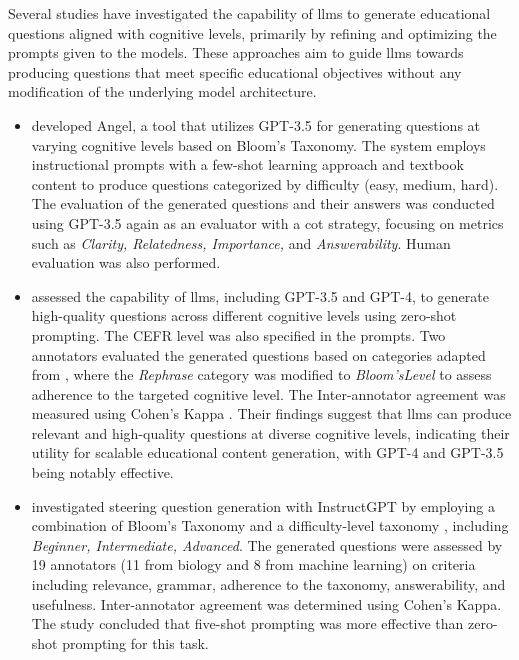  Several studies have investigated the capability of \ac{llms} to generate educational questions aligned with cognitive levels, primarily by refining and optimizing the prompts given to the models. These approaches aim to guide \ac{llms} towards producing questions that meet specific educational objectives without any modification of the underlying model architecture.
\begin{itemize}
    \item \cite{blobstein_angel_2023} developed Angel, a tool that utilizes GPT-3.5 for generating questions at varying cognitive levels based on Bloom's Taxonomy. The system employs instructional prompts with a few-shot learning approach and textbook content to produce questions categorized by difficulty (easy, medium, hard). The evaluation of the generated questions and their answers was conducted using GPT-3.5 again as an evaluator with a \ac{cot} strategy, focusing on metrics such as \textit{Clarity, Relatedness, Importance,} and \textit{Answerability}. Human evaluation was also performed.
    \item \cite{scaria_how_2024} assessed the capability of \ac{llms}, including GPT-3.5 and GPT-4, to generate high-quality questions across different cognitive levels using zero-shot prompting. The CEFR level was also specified in the prompts. Two annotators evaluated the generated questions based on categories adapted from \cite{horbach_linguistic_2020}, where the \textit{Rephrase} category was modified to \textit{Bloom'sLevel} to assess adherence to the targeted cognitive level. The Inter-annotator agreement was measured using Cohen's Kappa \cite{cohen_coefficient_1960}. Their findings suggest that \ac{llms} can produce relevant and high-quality questions at diverse cognitive levels, indicating their utility for scalable educational content generation, with GPT-4 and GPT-3.5 being notably effective.
    \item \cite{elkins_how_2023} investigated steering question generation with InstructGPT \cite{ouyang_training_2022} by employing a combination of Bloom's Taxonomy and a difficulty-level taxonomy \cite{perez_automatic_2012}, including \textit{Beginner, Intermediate, Advanced}. The generated questions were assessed by 19 annotators (11 from biology and 8 from machine learning) on criteria including relevance, grammar, adherence to the taxonomy, answerability, and usefulness. Inter-annotator agreement was determined using Cohen's Kappa. The study concluded that five-shot prompting was more effective than zero-shot prompting for this task.

\end{itemize}
